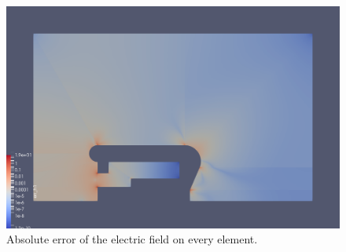 \begin{center}
\begin{figure}[H]
  \includegraphics[width=\textwidth]{figures/insulator/error_elem}
  \caption{Absolute error of the electric field on every element.}
  \label{fig:error_elem}
\end{figure}
\end{center}
